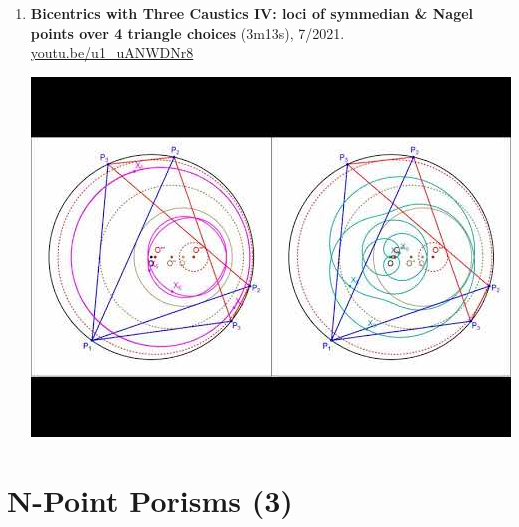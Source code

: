 \documentclass[12pt]{article}
\begin{document}
\begin{enumerate}[resume]
% 
\item \textbf{Bicentrics with Three Caustics IV: loci of symmedian \& Nagel points over 4 triangle choices} (3m13s), 7/2021. \href{https://youtu.be/u1_uANWDNr8}{\url{youtu.be/u1\_uANWDNr8}}
\begin{center}\includegraphics[width=.5\textwidth]{pics/u1_uANWDNr8.jpg}\end{center}
% 
\end{enumerate}

\section{N-Point Porisms (3)}
\end{document}
